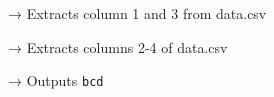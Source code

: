 → Extracts column 1 and 3 from data.csv

    \begin{Shaded}
\begin{Highlighting}[]
 \StringTok{\textquotesingle{},\textquotesingle{}} 
\end{Highlighting}
\end{Shaded}

→ Extracts columns 2-4 of data.csv

    \begin{Shaded}
\begin{Highlighting}[]
  \KeywordTok{|}  
\end{Highlighting}
\end{Shaded}

→ Outputs \texttt{bcd}


    
    
    
